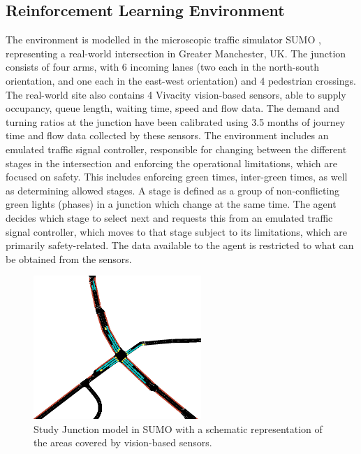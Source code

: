 \documentclass[a4paper, conference]{IEEEtran}
\begin{document}
\subsection{Reinforcement Learning Environment}
The environment is modelled in the microscopic traffic simulator SUMO \cite{sumo}, representing a real-world intersection in Greater Manchester, UK.
The junction consists of four arms, with 6 incoming lanes (two each in the north-south orientation, and one each in the east-west orientation) and 4 pedestrian crossings.
The real-world site also contains 4 Vivacity vision-based sensors, able to supply occupancy, queue length, waiting time, speed and flow data.
The demand and turning ratios at the junction have been calibrated using 3.5 months of journey time and flow data collected by these sensors.
The environment includes an emulated traffic signal controller, responsible for changing between the different stages in the intersection and enforcing the operational limitations, which are focused on safety.
This includes enforcing green times, inter-green times, as well as determining allowed stages.  
A stage is defined as a group of non-conflicting green lights (phases) in a junction which change at the same time.
The agent decides which stage to select next and requests this from an emulated traffic signal controller, which moves to that stage subject to its limitations, which are primarily safety-related.
The data available to the agent is restricted to what can be obtained from the sensors.     
\begin{figure}                                                
\centering                                                    
\includegraphics[width=2.5in]{intersection}                                    
\caption{Study Junction model in SUMO with a schematic representation of the areas covered by vision-based sensors.}                                  
\label{intersection}                                               
\end{figure}     
\end{document}
